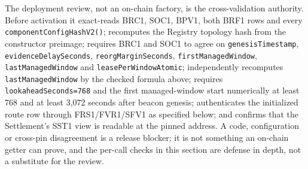 \documentclass[a4paper,11pt]{article}
\newcommand{\code}[1]{\nolinkurl{#1}}
\begin{document}
The deployment review, not an on-chain factory, is the cross-validation
authority.  Before activation it exact-reads BRC1, SOC1, BPV1, both BRF1 rows
and every \code{componentConfigHashV2()}; recomputes the Registry topology
hash from the constructor preimage; requires BRC1 and SOC1 to agree on
\code{genesisTimestamp}, \code{evidenceDelaySeconds},
\code{reorgMarginSeconds}, \code{firstManagedWindow},
\code{lastManagedWindow} and \code{leasePerWindowAtomic}; independently
recomputes \code{lastManagedWindow} by the checked formula above; requires
\code{lookaheadSeconds=768} and the first managed-window start numerically at
least 768 and at least 3,072 seconds after beacon genesis; authenticates the
initialized route row through FRS1/FVR1/SFV1 as specified below; and confirms
that the Settlement's SST1 view is readable at the pinned address.  A code,
configuration or cross-pin disagreement is a release blocker; it is not
something an on-chain getter can prove, and the per-call checks in this
section are defense in depth, not a substitute for the review.
\end{document}
